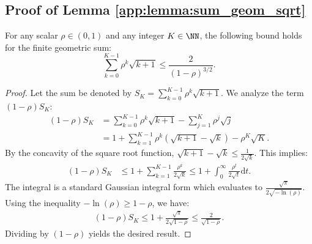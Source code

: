 \documentclass[11pt, letterpaper]{article}
\begin{document}
\subsection{Proof of Lemma \ref{app:lemma:sum_geom_sqrt}}
\begin{lemma}
\label{app:lemma:sum_geom_sqrt}
For any scalar $\rho \in (0, 1)$ and any integer $K \in \NN$, the following bound holds for the finite geometric sum:
\begin{equation}
    \label{app:eq:sum_geom_sqrt_lemma8}
    \sum_{k = 0}^{K - 1} \rho^k \sqrt{k + 1}  
    \leq \frac{2}{(1 - \rho)^{3/2}}.
\end{equation}
\end{lemma}
\begin{proof}
Let the sum be denoted by $S_K = \sum_{k = 0}^{K - 1} \rho^k \sqrt{k + 1}$. We analyze the term $(1-\rho)S_K$:
\begin{align*}
    (1 - \rho) S_K &= \sum_{k = 0}^{K - 1} \rho^k \sqrt{k+1} - \sum_{j = 1}^K \rho^{j} \sqrt{j} \\
    &= 1 + \sum_{k=1}^{K-1} \rho^k(\sqrt{k+1} - \sqrt{k}) - \rho^K\sqrt{K}.
\end{align*}
By the concavity of the square root function, $\sqrt{k+1} - \sqrt{k} \leq \frac{1}{2\sqrt{k}}$. This implies:
\begin{align*}
    (1 - \rho) S_K &\leq 1 + \sum_{k = 1}^{K- 1} \frac{\rho^{k}}{2 \sqrt{k}} 
    \leq 1 + \int_0^{\infty} \frac{\rho^{t}}{2 \sqrt{t}}\mathrm{d}t.
\end{align*}
The integral is a standard Gaussian integral form which evaluates to $\frac{\sqrt{\pi}}{2 \sqrt{-\ln(\rho)}}$. Using the inequality $-\ln(\rho) \geq 1 - \rho$, we have:
\begin{align*}
    (1 - \rho) S_K \leq 1 + \frac{\sqrt{\pi}}{2 \sqrt{1-\rho}} \leq \frac{2}{\sqrt{1-\rho}}.
\end{align*}
Dividing by $(1-\rho)$ yields the desired result.
\end{proof}
\end{document}
